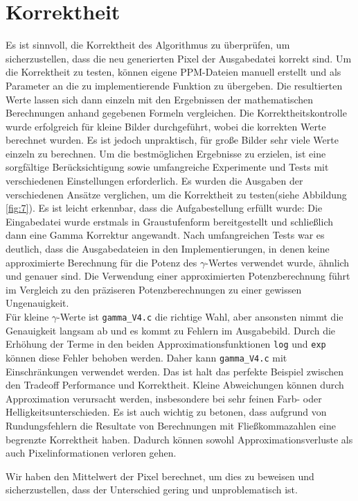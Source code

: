 \documentclass[course=erap]{aspdoc}
\begin{document}
\section{Korrektheit}
Es ist sinnvoll, die Korrektheit des Algorithmus zu überprüfen, um sicherzustellen, dass die neu generierten Pixel der Ausgabedatei korrekt sind.
Um die Korrektheit zu testen, können eigene PPM-Dateien manuell erstellt und als Parameter an die zu implementierende Funktion zu übergeben. Die resultierten Werte lassen sich dann einzeln mit den Ergebnissen der mathematischen Berechnungen anhand gegebenen Formeln vergleichen. Die Korrektheitskontrolle wurde erfolgreich für kleine Bilder durchgeführt, wobei die korrekten Werte berechnet wurden.
Es ist jedoch unpraktisch, für große Bilder sehr viele Werte einzeln zu berechnen. Um die bestmöglichen Ergebnisse zu erzielen, ist eine sorgfältige Berücksichtigung sowie umfangreiche Experimente und Tests mit verschiedenen Einstellungen erforderlich. Es wurden die Ausgaben der verschiedenen Ansätze verglichen, um die Korrektheit zu testen(siehe Abbildung \eqref{fig:7}).
Es ist leicht erkennbar, dass die Aufgabestellung erfüllt wurde: Die Eingabedatei wurde erstmals in Graustufenform bereitgestellt und schließlich dann eine Gamma Korrektur
angewandt. 
Nach umfangreichen Tests war es deutlich, dass die Ausgabedateien in den Implementierungen, in denen keine approximierte Berechnung für die Potenz des $\gamma$-Wertes verwendet wurde, ähnlich und genauer sind.
Die Verwendung einer approximierten Potenzberechnung führt im Vergleich zu den präziseren Potenzberechnungen zu einer gewissen Ungenauigkeit.\\
Für kleine $\gamma$-Werte ist \texttt{gamma\_V4.c} die richtige Wahl, aber ansonsten nimmt die Genauigkeit langsam ab und es kommt zu Fehlern im Ausgabebild. Durch die Erhöhung der Terme in den beiden Approximationsfunktionen \texttt{log} und \texttt{exp} können diese Fehler behoben werden. Daher kann \texttt{gamma\_V4.c} mit Einschränkungen verwendet werden. Das ist halt das perfekte Beispiel zwischen den Tradeoff Performance und Korrektheit.
Kleine Abweichungen können durch Approximation verursacht werden, insbesondere bei sehr feinen Farb- oder Helligkeitsunterschieden. 
Es ist auch wichtig zu betonen, dass aufgrund von Rundungsfehlern die Resultate von Berechnungen mit Fließkommazahlen eine begrenzte Korrektheit haben. Dadurch können sowohl Approximationsverluste als auch Pixelinformationen verloren gehen. \par
Wir haben den Mittelwert der Pixel berechnet, um dies zu beweisen und sicherzustellen, dass der Unterschied gering und unproblematisch ist. 
\end{document}
